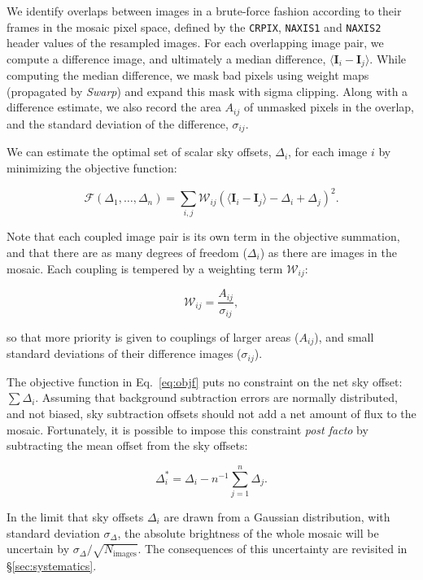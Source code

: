 \documentclass[iop]{emulateapj}
\newcommand{\vect}[1]{\boldsymbol{#1}} %
\newcommand{\sw}[1]{\textit{#1}} %
\newcommand{\Eq}[1]{Eq.~\ref{eq:#1}}  %
\newcommand{\Sec}[1]{\S\ref{sec:#1}}  %
\begin{document}
We identify overlaps between images in a brute-force fashion according to their frames in the mosaic pixel space, defined by the \texttt{CRPIX}, \texttt{NAXIS1} and \texttt{NAXIS2} header values of the resampled images.
For each overlapping image pair, we compute a difference image, and ultimately a median difference, $\langle \vect{I}_i - \vect{I}_j \rangle$.
While computing the median difference, we mask bad pixels using weight maps (propagated by \sw{Swarp}) and expand this mask with sigma clipping.
Along with a difference estimate, we also record the area $A_{ij}$ of unmasked pixels in the overlap, and the standard deviation of the difference, $\sigma_{ij}$.

We can estimate the optimal set of scalar sky offsets, $\Delta_i$, for each image $i$ by minimizing the objective function:

\begin{equation}
    \mathcal{F} \left(\Delta_1,\ldots,\Delta_n \right) = \sum_{i,j} \mathcal{W}_{ij} \left( \langle \vect{I}_i - \vect{I}_j \rangle - \Delta_i + \Delta_j \right)^2.
    \label{eq:objf}
\end{equation}

\noindent Note that each coupled image pair is its own term in the objective summation, and that there are as many degrees of freedom ($\Delta_i$) as there are images in the mosaic.
Each coupling is tempered by a weighting term $\mathcal{W}_{ij}$:

\begin{equation}
    \mathcal{W}_{ij} = \frac{A_{ij}}{\sigma_{ij}},
\end{equation}

\noindent so that more priority is given to couplings of larger areas ($A_{ij}$), and small standard deviations of their difference images ($\sigma_{ij}$).

The objective function in \Eq{objf} puts no constraint on the net sky offset: $\sum \Delta_i$.
Assuming that background subtraction errors are normally distributed, and not biased, sky subtraction offsets should not add a net amount of flux to the mosaic.
Fortunately, it is possible to impose this constraint \textit{post facto} by subtracting the mean offset from the sky offsets:

\begin{equation}
    \Delta_i^* = \Delta_i - n^{-1}\sum_{j=1}^n \Delta_j.
    \label{eq:netzero}
\end{equation}

\noindent In the limit that sky offsets $\Delta_i$ are drawn from a Gaussian distribution, with standard deviation $\sigma_\Delta$, the absolute brightness of the whole mosaic will be uncertain by $\sigma_\Delta / \sqrt{N_\mathrm{images}}$.
The consequences of this uncertainty are revisited in \Sec{systematics}.
\end{document}

